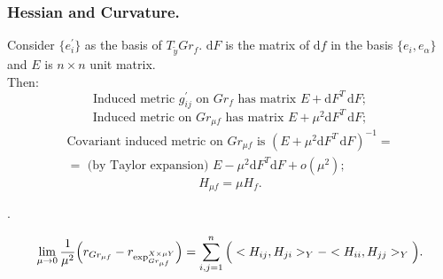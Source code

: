 \documentclass{llncs}
\newcommand{\Diff}{\mathrm{d}}
\begin{document}
\subsubsection{Hessian and Curvature.}

\begin{proposition} \label{PropScaled}
Consider $\{ e_i^{'} \}$ as the basis of $T_{\tilde{y}}Gr_f$. 
$\Diff F$ is the matrix of $\Diff f$ in the basis $\{ e_i, e_{\alpha} \}$ and $E$ is $n\times n$ unit matrix.
\\
Then:
\begin{equation}\label{p1} \textrm{Induced metric } g^{'}_{ij} \textrm{ on }Gr_f\textrm{ has matrix } E + \Diff F^{T} \, \Diff F ;\end{equation}
\begin{equation}\label{p2} \textrm{Induced metric on } Gr_{\mu f} \textrm{ has matrix } E + \mu^{2} \Diff F^{T} \, \Diff F; \end{equation}
\begin{multline}\label{p3} \textrm{Covariant induced metric on } Gr_{\mu f} \textrm{  is } (E + \mu^{2} \Diff F^{T} \, \Diff F)^{-1}=
\\
 = \textrm{ (by Taylor expansion) } E - \mu^{2} \Diff F^{T} \Diff F + o(\mu ^ {2});
\end{multline}
\begin{equation}\label{p4} H_{\mu f} = \mu H_f.\end{equation}
\end{proposition}.

\begin{lemma} \label{LemScalar}
\begin{multline*}
\lim_{\mu\to 0} \frac{1}{{\mu}^2} \Big( r_{Gr_{\mu f}} - r_{\tensor*{\exp}{^{X\times\mu Y}_ {Gr_{\mu f}} }} \Big)
= \sum_{i,j=1}^{n}\Big(<H_{ij},H_{ji}>_Y - <H_{ii},H_{jj}>_Y \Big).
\end{multline*}
\end{lemma}
\end{document}
